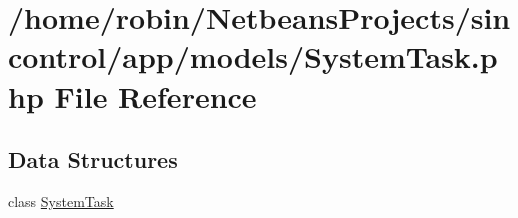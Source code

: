 \hypertarget{app_2models_2_system_task_8php}{}\section{/home/robin/\+Netbeans\+Projects/sincontrol/app/models/\+System\+Task.php File Reference}
\label{app_2models_2_system_task_8php}
\subsection*{Data Structures}
\begin{DoxyCompactItemize}
\item 
class \hyperlink{class_system_task}{System\+Task}
\end{DoxyCompactItemize}
